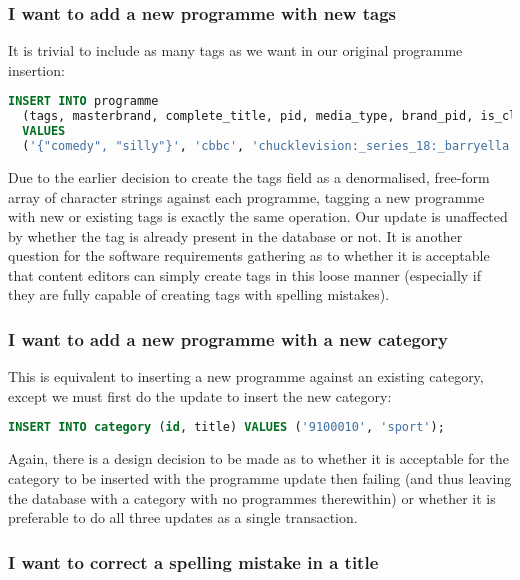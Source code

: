 \documentclass[11pt,a4paper]{article}
\begin{document}
\subsubsection{I want to add a new programme with new tags}

It is trivial to include as many tags as we want in our original programme
insertion:

\begin{lstlisting}[language=SQL]
  INSERT INTO programme
  (tags, masterbrand, complete_title, pid, media_type, brand_pid, is_clip)
  VALUES
  ('{"comedy", "silly"}', 'cbbc', 'chucklevision:_series_18:_barryella', 'b0079214', 'video', 'b006w487', '0');
\end{lstlisting}

Due to the earlier decision to create the tags field as a denormalised, free-form
array of character strings against each programme, tagging a new programme
with new or existing tags is exactly the same operation. Our update is unaffected
by whether the tag is already present in the database or not. It is another
question for the software requirements gathering as to whether it is
acceptable that content editors can simply create tags in this loose manner (especially
if they are fully capable of creating tags with spelling mistakes).

\subsubsection{I want to add a new programme with a new category}

This is equivalent to inserting a new programme against an existing category,
except we must first do the update to insert the new category:

\begin{lstlisting}[language=SQL]
  INSERT INTO category (id, title) VALUES ('9100010', 'sport');
\end{lstlisting}

Again, there is a design decision to be made as to whether it is
acceptable for the category to be inserted with the programme update
then failing (and thus leaving the database with a category with no
programmes therewithin) or whether it is preferable to do all
three updates as a single transaction.

\subsubsection{I want to correct a spelling mistake in a title}
\end{document}
